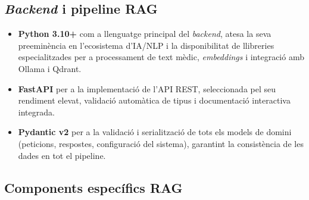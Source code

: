 \documentclass[CAT]{TFUOC}%
\begin{document}
\subsection{\textit{Backend} i pipeline RAG}

\begin{itemize}
    \item \textbf{Python 3.10+} com a llenguatge principal del \textit{backend}, atesa la seva preeminència en l'ecosistema d'IA/NLP i la disponibilitat de llibreries especialitzades per a processament de text mèdic, \textit{embeddings} i integració amb Ollama i Qdrant.

    \item \textbf{FastAPI} per a la implementació de l'API REST, seleccionada pel seu rendiment elevat, validació automàtica de tipus i documentació interactiva integrada.

    \item \textbf{Pydantic v2} per a la validació i serialització de tots els models de domini (peticions, respostes, configuració del sistema), garantint la consistència de les dades en tot el pipeline.
\end{itemize}

\subsection{Components específics RAG}
\end{document}
